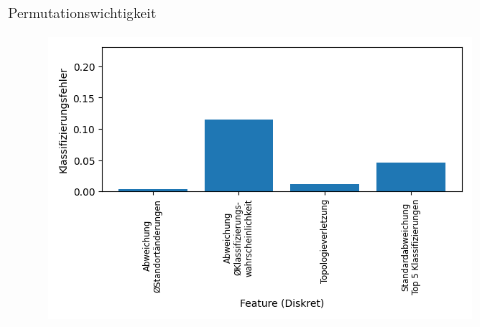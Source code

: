 \documentclass[10pt]{beamer}
\begin{document}
\begin{frame}{Permutationswichtigkeit}
    \begin{figure}
        \centering
        \includegraphics[width=\linewidth]{anomaly_detection/fi_anomaly_dt.png}
    \end{figure}
\end{frame}
\end{document}
